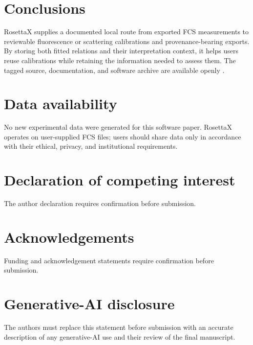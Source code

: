 \documentclass[preprint,12pt]{elsarticle}
\begin{document}
\section{Conclusions}

RosettaX supplies a documented local route from exported FCS measurements to
reviewable fluorescence or scattering calibrations and provenance-bearing
exports. By storing both fitted relations and their interpretation context, it
helps users reuse calibrations while retaining the information needed to assess
them. The tagged source, documentation, and software archive are available
openly \cite{RosettaX}.

\section*{Data availability}

No new experimental data were generated for this software paper. RosettaX
operates on user-supplied FCS files; users should share data only in accordance
with their ethical, privacy, and institutional requirements.

\section*{Declaration of competing interest}

The author declaration requires confirmation before submission.

\section*{Acknowledgements}

Funding and acknowledgement statements require confirmation before submission.

\section*{Generative-AI disclosure}

The authors must replace this statement before submission with an accurate
description of any generative-AI use and their review of the final manuscript.



\end{document}
